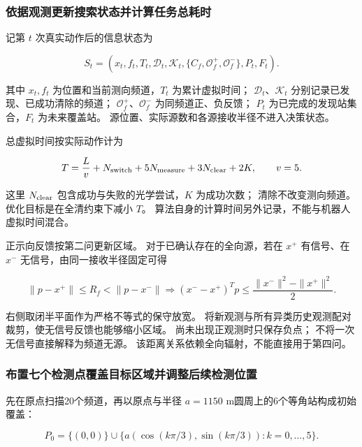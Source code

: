 \subsubsection{依据观测更新搜索状态并计算任务总耗时}\label{sec:q3-1}

记第 \(t\) 次真实动作后的信息状态为

\begin{equation}\label{eq:q3-1}
S_t=\left(x_t,f_t,T_t,\mathcal D_t,\mathcal K_t,
\{\widehat C_f,\mathcal O_f^+,\mathcal O_f^-\},P_t,F_t\right).
\end{equation}

其中 \(x_t,f_t\) 为位置和当前测向频道，\(T_t\) 为累计虚拟时间；
\(\mathcal D_t\)、\(\mathcal K_t\) 分别记录已发现、已成功清除的频道；
\(\mathcal O_f^+\)、\(\mathcal O_f^-\) 为同频道正、负反馈；
\(P_t\) 为已完成的发现站集合，\(F_t\) 为未来覆盖站。
源位置、实际源数和各源接收半径不进入决策状态。

总虚拟时间按实际动作计为

\begin{equation}\label{eq:q3-2}
T=\frac{L}{v}+N_{\rm switch}+5N_{\rm measure}
+3N_{\rm clear}+2K,\qquad v=5.
\end{equation}

这里 \(N_{\rm clear}\) 包含成功与失败的光学尝试，\(K\) 为成功次数；
清除不改变测向频道。
优化目标是在全清约束下减小 \(T\)。
算法自身的计算时间另外记录，不能与机器人虚拟时间混合。

正示向反馈按第二问更新区域。
对于已确认存在的全向源，若在 \(x^+\) 有信号、在 \(x^-\) 无信号，由同一接收半径固定可得

\begin{equation}\label{eq:q3-3}
\|p-x^+\|\le R_f<\|p-x^-\|
\Longrightarrow
(x^--x^+)^Tp\le\frac{\|x^-\|^2-\|x^+\|^2}{2}.
\end{equation}

右侧取闭半平面作为严格不等式的保守放宽。
将新观测与所有异类历史观测配对裁剪，使无信号反馈也能够缩小区域。
尚未出现正观测时只保存负点；
不将一次无信号直接解释为频道无源。
该距离关系依赖全向辐射，不能直接用于第四问。

\subsubsection{布置七个检测点覆盖目标区域并调整后续检测位置}\label{sec:q3-2}

先在原点扫描20个频道，再以原点与半径 \(a=1150\) m圆周上的6个等角站构成初始覆盖：

\begin{equation}\label{eq:q3-4}
P_0=\{(0,0)\}\cup
\{a(\cos(k\pi/3),\sin(k\pi/3)):k=0,\ldots,5\}.
\end{equation}

